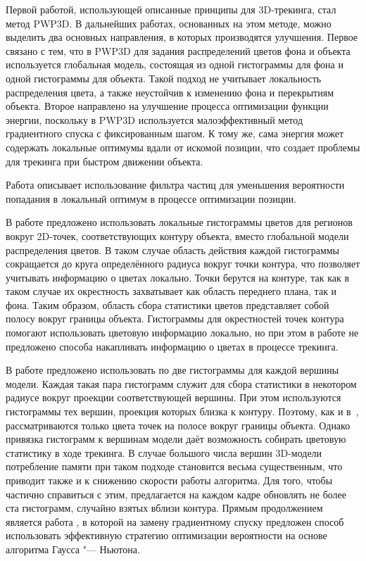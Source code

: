 Первой работой, использующей описанные принципы для 3D-трекинга, стал метод
PWP3D\cite{PWP3D}.
В дальнейших работах, основанных на этом методе, можно выделить два основных
направления, в которых производятся улучшения.
Первое связано с тем, что в PWP3D для задания распределений цветов фона и
объекта используется глобальная модель, состоящая из одной гистограммы для фона
и одной гистограммы для объекта.
Такой подход не учитывает локальность распределения цвета, а также неустойчив к
изменению фона и перекрытиям объекта.
Второе направлено на улучшение процесса оптимизации функции энергии, поскольку
в PWP3D используется малоэффективный метод градиентного спуска с фиксированным
шагом.
К тому же, сама энергия может содержать локальные оптимумы вдали от искомой
позиции, что создает проблемы для трекинга при быстром движении объекта.

Работа \cite{Zhao2014} описывает использование фильтра частиц для уменьшения
вероятности попадания в локальный оптимум в процессе оптимизации позиции.

В работе \cite{Hexner2016} предложено использовать локальные гистограммы цветов
для регионов вокруг 2D-точек, соответствующих контуру объекта, вместо
глобальной модели распределения цветов.
В таком случае область действия каждой гистограммы сокращается до круга
определённого радиуса вокруг точки контура, что позволяет учитывать информацию
о цветах локально.
Точки берутся на контуре, так как в таком случае их окрестность захватывает как
область переднего плана, так и фона.
Таким образом, область сбора статистики цветов представляет собой полосу вокруг
границы объекта.
Гистограммы для окрестностей точек контура помогают использовать цветовую
информацию локально, но при этом в работе \cite{Hexner2016} не предложено
способа накапливать информацию о цветах в процессе трекинга.

В работе \cite{Tjaden2017} предложено использовать по две гистограммы для
каждой вершины модели.
Каждая такая пара гистограмм служит для сбора статистики в некотором радиусе
вокруг проекции соответствующей вершины.
При этом используются гистограммы тех вершин, проекция которых близка к
контуру.
Поэтому, как и в~\cite{Hexner2016}, рассматриваются только цвета точек на
полосе вокруг границы объекта.
Однако привязка гистограмм к вершинам модели даёт возможность собирать цветовую
статистику в ходе трекинга.
В случае большого числа вершин 3D-модели потребление памяти при таком подходе
становится весьма существенным, что приводит также и к снижению скорости работы
алгоритма.
Для того, чтобы частично справиться с этим, предлагается на каждом
кадре обновлять не более ста гистограмм, случайно взятых вблизи контура.
Прямым продолжением \cite{Tjaden2017} является работа \cite{Tjaden2018}, в
которой на замену градиентному спуску предложен способ использовать эффективную
стратегию оптимизации вероятности на основе алгоритма Гаусса "--- Ньютона.

